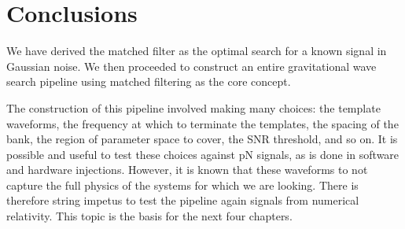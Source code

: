 \section{Conclusions}

We have derived the matched filter as the optimal search for a known
signal in Gaussian noise.  We then proceeded to construct an entire
gravitational wave search pipeline using matched filtering as the core
concept.

The construction of this pipeline involved making many choices: the
template waveforms, the frequency at which to terminate the templates,
the spacing of the bank, the region of parameter space to cover, the
SNR threshold, and so on.  It is possible and useful to test
these choices against pN signals, as is done in software and hardware
injections.   However, it is known that these waveforms to not capture
the full physics of the systems for which we are looking.  There is
therefore string impetus to test the pipeline again signals from
numerical relativity.  This topic is the basis for the next four
chapters.



